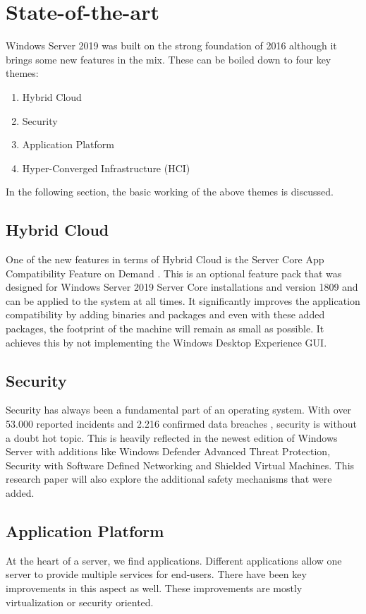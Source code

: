 \section{State-of-the-art}\label{sec:state-of-the-art}
Windows Server 2019 was built on the strong foundation of 2016 although it brings some new features \autocite{Gerend2018} in the mix. 
These can be boiled down to four key themes:
\begin{enumerate}
	\item Hybrid Cloud
	\item Security
	\item Application Platform
	\item Hyper-Converged Infrastructure (HCI)
\end{enumerate}
In the following section, the basic working of the above themes is discussed.
\subsection{Hybrid Cloud}
One of the new features in terms of Hybrid Cloud is the Server Core App Compatibility Feature on Demand \autocite{Pacquer2018}. This is an optional feature pack that was designed for Windows Server 2019 Server Core installations and version 1809 and can be applied to the system at all times. 
It significantly improves the application compatibility by adding binaries and packages and even with these added packages, the footprint of the machine will remain as small as possible. It achieves this by not implementing the Windows Desktop Experience GUI.
\subsection{Security}
Security has always been a fundamental part of an operating system. With over 53.000 reported incidents and 2.216 confirmed data breaches \autocite{Verizon2018}, security is without a doubt hot topic. This is heavily reflected in the newest edition of Windows Server with additions like Windows Defender Advanced Threat Protection, Security with Software Defined Networking and Shielded Virtual Machines. This research paper will also explore the additional safety mechanisms that were added.
\subsection{Application Platform}
At the heart of a server, we find applications. Different applications allow one server to provide multiple services for end-users. There have been key improvements in this aspect as well. These improvements are mostly virtualization or security oriented. 
